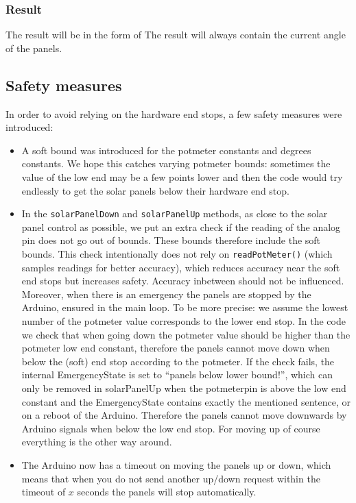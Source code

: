     \subsubsection{Result}
    The result will be in the form of %
    The result will always contain the current angle of the panels.

\subsection{Safety measures}\label{subsec:safetyMeasures}
    In order to avoid relying on the hardware end stops, a few safety measures were introduced:
    \begin{itemize}
        \item A soft bound was introduced for the potmeter constants and degrees constants.
        We hope this catches varying potmeter bounds: sometimes the value of the low end may be a few points lower and then the code would try endlessly to get the solar panels below their hardware end stop.
        \item In the \verb|solarPanelDown| and \verb|solarPanelUp| methods, as close to the solar panel control as possible, we put an extra check if the reading of the analog pin does not go out of bounds.
        These bounds therefore include the soft bounds.
        This check intentionally does not rely on \verb|readPotMeter()| (which samples readings for better accuracy), which reduces accuracy near the soft end stops but increases safety.
        Accuracy inbetween should not be influenced.
        Moreover, when there is an emergency the panels are stopped by the Arduino, ensured in the main loop.
        To be more precise: we assume the lowest number of the potmeter value corresponds to the lower end stop.
        In the code we check that when going down the potmeter value should be higher than the potmeter low end constant, therefore the panels cannot move down when below the (soft) end stop according to the potmeter.
        If the check fails, the internal EmergencyState is set to ``panels below lower bound!'', which can only be removed in solarPanelUp when the potmeterpin is above the low end constant and the EmergencyState contains exactly the mentioned sentence, or on a reboot of the Arduino.
        Therefore the panels cannot move downwards by Arduino signals when below the low end stop.
        For moving up of course everything is the other way around.
        \item The Arduino now has a timeout on moving the panels up or down, which means that when you do not send another up/down request within the timeout of $x$ seconds the panels will stop automatically.

\end{itemize}

